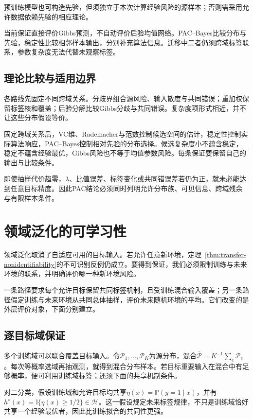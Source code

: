预训练模型也可构造先验，但须独立于本次计算经验风险的源样本；否则需采用允许数据依赖先验的相应理论。

当前保证直接评价Gibbs预测，不自动评价后验均值网络。PAC--Bayes比较分布与先验，稳定性比较相邻样本输出，分别补充算法信息。迁移中二者仍须跨域标签联系，参数复杂度无法代替未观察标签。

\subsection{理论比较与适用边界}
\label{sec:adaptation-comparison}

各路线先固定不同跨域关系。分歧界组合源风险、输入散度与共同错误；重加权保留标签核和覆盖；后验分解比较Gibbs分歧与共同错误。复杂度项形式相近，并不让这些分布假设等价。

固定跨域关系后，VC维、Rademacher与范数控制候选空间的估计，稳定性控制实际算法响应，PAC--Bayes控制相对先验的分布选择。候选复杂度小不蕴含稳定，稳定不蕴含经验最优，Gibbs风险也不等于均值参数风险。每条保证要保留自己的输出与比较条件。

即使抽样代价趋零，$\lambda$、比值误差、标签变化或共同错误差若仍为正，就未必能达到任意目标精度。因此PAC结论必须同时列明允许分布族、可见信息、跨域残余与有限样本条件。

\section{领域泛化的可学习性}
\label{sec:domain-generalization}

领域泛化取消了自适应可用的目标输入。若允许任意新环境，定理~\ref{thm:transfer-nonidentifiability}的不可识别反例仍成立。要得到保证，我们必须限制训练与未来环境的联系，并明确评价哪一种新环境风险。

一条路径要求每个允许目标保留共同标签机制，且受训练混合输入覆盖；另一条路径假定训练与未来环境从共同总体抽样，评价未来随机环境的平均。它们改变的是外层评价对象，下面分别建立。

\subsection{逐目标域保证}
\label{sec:dg-shared-mechanism}

多个训练域可以联合覆盖目标输入。令$\mathcal P_1,\ldots,\mathcal P_K$为源分布，混合$\overline{\mathcal P}=K^{-1}\sum_e\mathcal P_e$。每次等概率选域再抽观测，就得到混合分布样本。若目标重要输入在混合中有足够概率，便可利用训练域标签；还须下面的共享机制条件。

对二分类，假设训练域和允许目标均共享$\eta(x)=\mathbb P(y=1\mid x)$，并有$h^\star(x)=\mathbb I\{\eta(x)\geq1/2\}\in\mathcal H$。这一假设规定未来标签规律，不只是训练域恰好共享一个经验最优者，因此比训练拟合的共同性更强。

